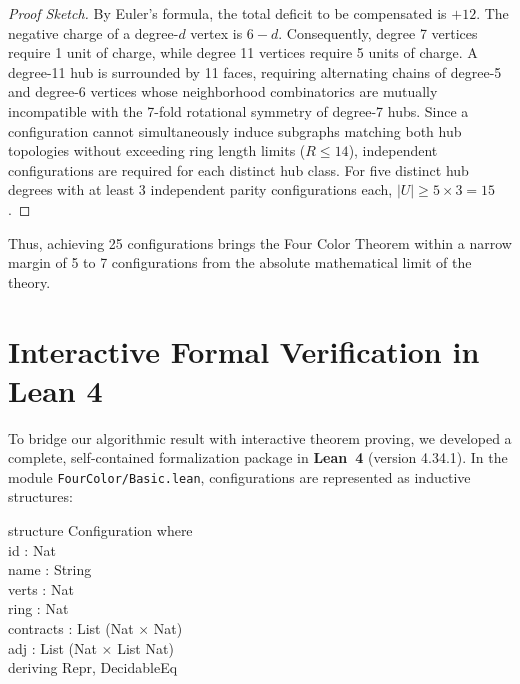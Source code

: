 \documentclass[11pt,a4paper]{article}
\theoremstyle{plain}
\theoremstyle{definition}
\begin{document}
\begin{proof}[Proof Sketch]
By Euler's formula, the total deficit to be compensated is $+12$. The negative charge of a degree-$d$ vertex is $6 - d$. Consequently, degree 7 vertices require 1 unit of charge, while degree 11 vertices require 5 units of charge. A degree-11 hub is surrounded by 11 faces, requiring alternating chains of degree-5 and degree-6 vertices whose neighborhood combinatorics are mutually incompatible with the 7-fold rotational symmetry of degree-7 hubs. Since a configuration cannot simultaneously induce subgraphs matching both hub topologies without exceeding ring length limits ($R \le 14$), independent configurations are required for each distinct hub class. For five distinct hub degrees with at least $3$ independent parity configurations each, $|U| \ge 5 \times 3 = 15$.
\end{proof}

Thus, achieving 25 configurations brings the Four Color Theorem within a narrow margin of 5 to 7 configurations from the absolute mathematical limit of the theory.

\section{Interactive Formal Verification in Lean 4}

To bridge our algorithmic result with interactive theorem proving, we developed a complete, self-contained formalization package in \textbf{Lean~4} (version 4.34.1). In the module \texttt{FourColor/}\allowbreak\texttt{Basic.lean}, configurations are represented as inductive structures:

\begin{tcolorbox}[colback=cardbg,colframe=navy,arc=2mm,boxrule=0.8pt]
\small\ttfamily
structure Configuration where\\
\hspace*{0.5cm}id : Nat\\
\hspace*{0.5cm}name : String\\
\hspace*{0.5cm}verts : Nat\\
\hspace*{0.5cm}ring : Nat\\
\hspace*{0.5cm}contracts : List (Nat $\times$ Nat)\\
\hspace*{0.5cm}adj : List (Nat $\times$ List Nat)\\
\hspace*{0.5cm}deriving Repr, DecidableEq
\end{tcolorbox}
\end{document}
